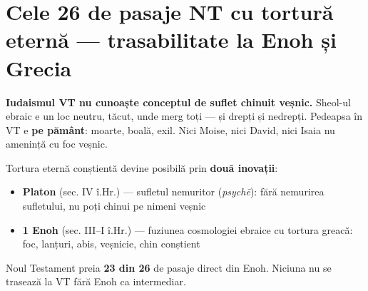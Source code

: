 \documentclass[12pt,a4paper,twoside,openany]{book}
\begin{document}
\chapter{Cele 26 de pasaje NT cu tortură eternă — trasabilitate la Enoh și Grecia}\label{26-pasaje}
\textbf{Iudaismul VT nu cunoaște conceptul de suflet chinuit veșnic.} Sheol-ul ebraic e un loc neutru, tăcut, unde merg toți — și drepți și nedrepți. Pedeapsa în VT e \textbf{pe pământ}: moarte, boală, exil. Nici Moise, nici David, nici Isaia nu amenință cu foc veșnic.

Tortura eternă conștientă devine posibilă prin \textbf{două inovații}:

\begin{itemize}
  \item \textbf{Platon} (sec. IV î.Hr.) — sufletul nemuritor (\textit{psychē}): fără nemurirea sufletului, nu poți chinui pe nimeni veșnic
  \item \textbf{1 Enoh} (sec. III–I î.Hr.) — fuziunea cosmologiei ebraice cu tortura greacă: foc, lanțuri, abis, veșnicie, chin conștient
\end{itemize}
Noul Testament preia \textbf{23 din 26} de pasaje direct din Enoh. Niciuna nu se trasează la VT fără Enoh ca intermediar.
\end{document}
